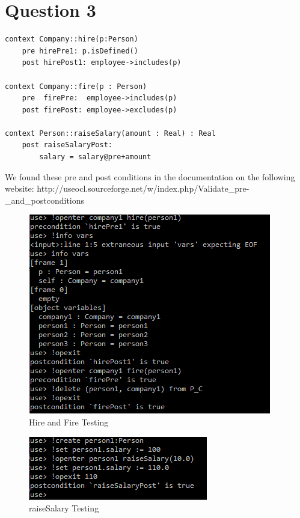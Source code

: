 \documentclass{article}
\begin{document}
\section*{Question 3}


\begin{Verbatim}
context Company::hire(p:Person)
	pre hirePre1: p.isDefined()
	post hirePost1: employee->includes(p)

context Company::fire(p : Person)
	pre  firePre:  employee->includes(p)
	post firePost: employee->excludes(p)

context Person::raiseSalary(amount : Real) : Real
	post raiseSalaryPost:
		salary = salary@pre+amount
\end{Verbatim}
	We found these pre and post conditions in the documentation on the following website: \newline
	http://useocl.sourceforge.net/w/index.php/Validate\_pre-\_and\_postconditions

	\begin{figure}[h]
		\includegraphics[width=\linewidth]{soil1.PNG}
		\caption{Hire and Fire Testing}
		\label{fig:seq}
	\end{figure}
	
	\begin{figure}[h]
		\includegraphics[width=\linewidth]{soil2.PNG}
		\caption{raiseSalary Testing}
		\label{fig:seq}
	\end{figure}
\end{document}
